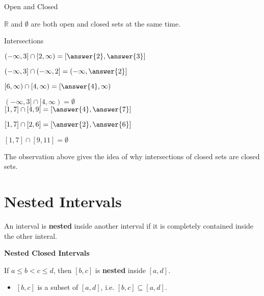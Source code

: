 \documentclass{ximera}
\begin{document}
\begin{fact} Open and Closed

$\mathbb{R}$ and $\emptyset$ are both open and closed sets at the same time.


\end{fact}






\begin{observation} Intersections

$(-\infty, 3] \cap  [2, \infty) = \left[\answer{2}, \answer{3}\right]$

$(-\infty, 3] \cap  (-\infty, 2] = \left(-\infty, \answer{2}\right]$

$[6, \infty)  \cap  [4, \infty) = \left[\answer{4}, \infty\right)$

$(-\infty, 3] \cap  [4, \infty) = \emptyset$ \\






$[1, 7] \cap  [4, 9] = \left[\answer{4}, \answer{7}\right]$

$[1, 7] \cap  [2, 6] = \left[\answer{2}, \answer{6}\right]$

$[1, 7] \cap  [9, 11] = \emptyset$


\end{observation}


The observation above gives the idea of why intersections of closed sets are closed sets.
















\section{Nested Intervals}


An interval is \textbf{nested} inside another interval if it is completely contained inside the other interal.





\textbf{Nested Closed Intervals}

If $a \leq b < c \leq d$, then $[b,c]$ is \textbf{\textcolor{purple!85!blue}{nested}} inside $[a,d]$.   

\begin{itemize}
\item $[b,c]$ is a subset of $[a,d]$, i.e. $[b,c] \subseteq [a,d]$.
\end{itemize}
\end{document}

